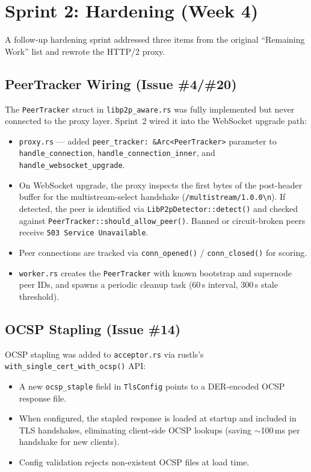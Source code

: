 \documentclass[a4paper, 11pt]{article}
\begin{document}
\section{Sprint 2: Hardening (Week 4)}

A follow-up hardening sprint addressed three items from the original
``Remaining Work'' list and rewrote the HTTP/2 proxy.

\subsection{PeerTracker Wiring (Issue \#4/\#20)}

The \texttt{PeerTracker} struct in \texttt{libp2p\_aware.rs} was fully
implemented but never connected to the proxy layer.  Sprint~2 wired it
into the WebSocket upgrade path:

\begin{itemize}[nosep]
  \item \texttt{proxy.rs} --- added \texttt{peer\_tracker: \&Arc<PeerTracker>}
        parameter to \texttt{handle\_connection}, \texttt{handle\_connection\_inner},
        and \texttt{handle\_websocket\_upgrade}.
  \item On WebSocket upgrade, the proxy inspects the first bytes of the
        post-header buffer for the multistream-select handshake
        (\texttt{/multistream/1.0.0\textbackslash n}).  If detected, the
        peer is identified via \texttt{LibP2pDetector::detect()} and checked
        against \texttt{PeerTracker::should\_allow\_peer()}.  Banned or
        circuit-broken peers receive \texttt{503 Service Unavailable}.
  \item Peer connections are tracked via \texttt{conn\_opened()} /
        \texttt{conn\_closed()} for scoring.
  \item \texttt{worker.rs} creates the \texttt{PeerTracker} with known
        bootstrap and supernode peer IDs, and spawns a periodic cleanup
        task (60\,s interval, 300\,s stale threshold).
\end{itemize}

\subsection{OCSP Stapling (Issue \#14)}

OCSP stapling was added to \texttt{acceptor.rs} via rustls's
\texttt{with\_single\_cert\_with\_ocsp()} API:

\begin{itemize}[nosep]
  \item A new \texttt{ocsp\_staple} field in \texttt{TlsConfig} points to
        a DER-encoded OCSP response file.
  \item When configured, the stapled response is loaded at startup and
        included in TLS handshakes, eliminating client-side OCSP lookups
        (saving $\sim$100\,ms per handshake for new clients).
  \item Config validation rejects non-existent OCSP files at load time.
\end{itemize}
\end{document}
